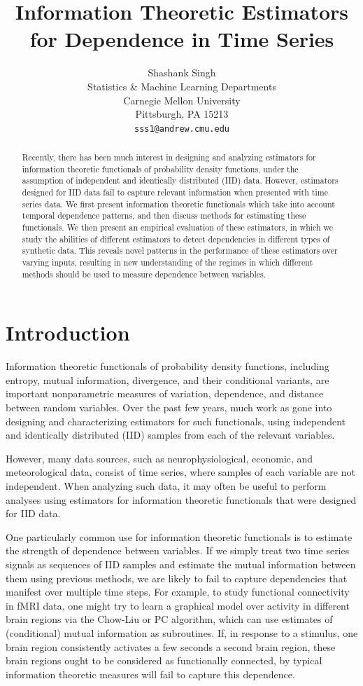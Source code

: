 \documentclass{article} %
\title{Information Theoretic Estimators for Dependence in Time Series}
\author{
Shashank Singh \\
Statistics \& Machine Learning Departments \\
Carnegie Mellon University \\
Pittsburgh, PA 15213 \\
\texttt{sss1@andrew.cmu.edu}
}
\begin{document}
\maketitle

\begin{abstract}
Recently, there has been much interest in designing and analyzing estimators
for information theoretic functionals of probability density functions, under
the assumption of independent and identically distributed (IID) data. However,
estimators designed for IID data fail to capture relevant information when
presented with time series data. We first present information theoretic
functionals which take into account temporal dependence patterns, and then
discuss methods for estimating these functionals. We then present an empirical
evaluation of these estimators, in which we study the abilities of different
estimators to detect dependencies in different types of synthetic data. This
reveals novel patterns in the performance of these estimators over varying
inputs, resulting in new understanding of the regimes in which different
methods should be used to measure dependence between variables.
\end{abstract}

\section{Introduction}
Information theoretic functionals of probability density functions, including
entropy, mutual information, divergence, and their conditional variants, are
important nonparametric measures of variation, dependence, and distance between
random variables. Over the past few years, much work as gone into designing and
characterizing estimators for such functionals, using independent and
identically distributed (IID) samples from each of the relevant variables.

However, many data sources, such as neurophysiological, economic, and
meteorological data, consist of time series, where samples of each variable are
not independent. When analyzing such data, it may often be useful to perform
analyses using estimators for information theoretic functionals that were
designed for IID data.

One particularly common use for information theoretic functionals is to
estimate the strength of dependence between variables. If we simply
treat two time series signals as sequences of IID samples and estimate the
mutual information between them using previous methods, we are likely to fail
to capture dependencies that manifest over multiple time steps.
For example, to study functional connectivity in fMRI data, one might try to
learn a graphical model over activity in different brain regions via the
Chow-Liu or PC algorithm, which can use estimates of (conditional) mutual
information as subroutines. If, in response to a stimulus, one brain region
consistently activates a few seconds a second brain region, these brain regions
ought to be considered as functionally connected, by typical information
theoretic measures will fail to capture this dependence.
\end{document}
